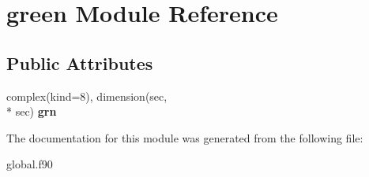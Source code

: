 \hypertarget{classgreen}{\section{green Module Reference}
\label{classgreen}
}
\subsection*{Public Attributes}
\begin{DoxyCompactItemize}
\item 
\hypertarget{classgreen_a3796dafc78d779510d66d8cfd172b6cf}{complex(kind=8), dimension(sec, \\*
sec) {\bfseries grn}}\label{classgreen_a3796dafc78d779510d66d8cfd172b6cf}

\end{DoxyCompactItemize}


The documentation for this module was generated from the following file\-:\begin{DoxyCompactItemize}
\item 
global.\-f90\end{DoxyCompactItemize}
